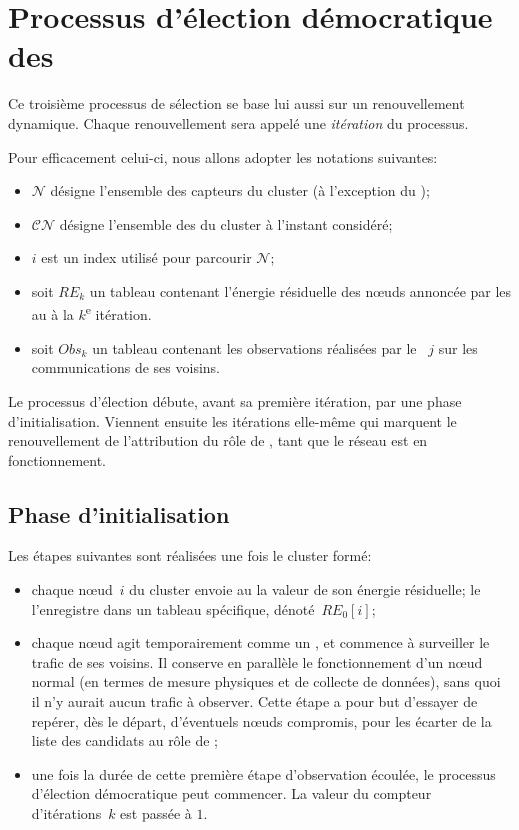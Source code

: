 \section{Processus d'élection démocratique des \cns}\label{sd:sec:proposal}

Ce troisième processus de sélection se base lui aussi sur un renouvellement dynamique.
Chaque renouvellement sera appelé une \emph{itération} du processus.

Pour efficacement celui-ci, nous allons adopter les notations suivantes:
\begin{itemize}
    \item $\mathcal{N}$ désigne l'ensemble des capteurs du cluster (à l'exception du \ch);
    \item $\mathcal{CN}$ désigne l'ensemble des \cns du cluster à l'instant considéré;
    \item $i$ est un index utilisé pour parcourir $\mathcal{N}$;
    \item soit $RE_k$ un tableau contenant l'énergie résiduelle des nœuds annoncée par les \cns au \ch à la $k$\textsuperscript{e} itération.
    \item soit $Obs_k$ un tableau contenant les observations réalisées par le \cn~$j$ sur les communications de ses voisins.
\end{itemize}

Le processus d'élection débute, avant sa première itération, par une phase d'initialisation.
Viennent ensuite les itérations elle-même qui marquent le renouvellement de l'attribution du rôle de \cn, tant que le réseau est en fonctionnement.

\subsection{Phase d'initialisation}

Les étapes suivantes sont réalisées une fois le cluster formé:
\begin{itemize}
    \item chaque nœud~$i$ du cluster envoie au \ch la valeur de son énergie résiduelle; le \CH l'enregistre dans un tableau spécifique, dénoté~$RE_0[i]$;
    \item chaque nœud agit temporairement comme un \cn, et commence à surveiller le trafic de ses voisins. Il conserve en parallèle le fonctionnement d'un nœud normal (en termes de mesure physiques et de collecte de données), sans quoi il n'y aurait aucun trafic à observer. Cette étape a pour but d'essayer de repérer, dès le départ, d'éventuels nœuds compromis, pour les écarter de la liste des candidats au rôle de \cn;
    \item une fois la durée de cette première étape d'observation écoulée, le processus d'élection démocratique peut commencer. La valeur du compteur d'itérations~$k$ est passée à $1$.
\end{itemize}

